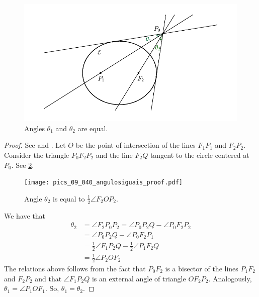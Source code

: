 \begin{figure}
	\begin{center}
 \includegraphics[scale=0.9]{chap_09/pics/pics_09_004-angulo_corda.pdf}
		\caption {Angles $\theta_1$ and $\theta_2$ are equal. 	\label{fig:09-angulocorda} }
	\end{center}

\end{figure}

 \begin{proof} See \cite{melrose1979} and \cite{akopyan2007-conics}.
Let $O$ be the point of intersection of the lines $F_1P_1$ and $F_2P_2.$
Consider the triangle $P_0F_2P_2$ and the line $F_2Q$ tangent to the circle centered at $P_0.$ See \cref{fig:angulosiguaisproof}.


\begin{figure}
	\begin{center}
 \texttt{[image: pics\_09\_040\_angulosiguais\_proof.pdf]}
		\caption {Angle   $\theta_2$ is equal to  $\frac{1}{2}\angle F_2OP_2$.	\label{fig:angulosiguaisproof} }
	\end{center}

\end{figure}

We have that
\begin{align*}
    \theta_2&=\angle F_2P_0P_2=\angle P_0P_2Q-\angle P_0F_2P_2\\ 
    &= \angle P_0P_2Q-\angle P_0F_2P_1\\
    &=\frac{1}{2}\angle F_1P_2Q -\frac{1}{2} \angle P_1F_2Q\\
    &=
    \frac{1}{2} \angle P_2OF_2
 \end{align*}
 The relations above follows from the fact that $P_0F_2$ is a bisector of the lines $P_1F_2$ and $F_2P_2$ and   that  $\angle F_1P_2Q$ is an external angle of triangle $OF_2P_2.$
 Analogously, $\theta_1=\angle P_1OF_1$. So, $\theta_1=\theta_2.$
\end{proof}

